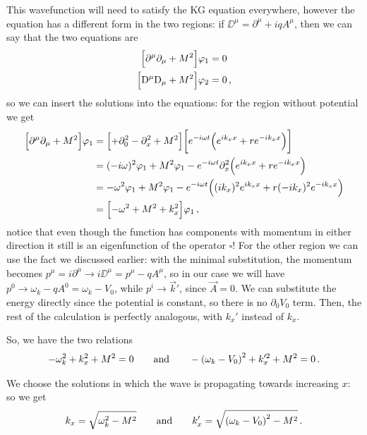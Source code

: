 \documentclass[main.tex]{subfiles}
\begin{document}
This wavefunction will need to satisfy the KG equation everywhere, however the equation has a different form in the two regions: if \(\DD^{\mu } = \partial^{\mu } + iqA^{\mu }\), then we can say that the two equations are 
%
\begin{align}
  \qty[\partial^{\mu } \partial_{\mu } + M^2] \varphi_1 &= 0 \\
  \qty[\mathrm{D}^{\mu } \mathrm{D}_{\mu } + M^2] \varphi_2 &= 0 
\,,
\end{align}
%
so we can insert the solutions into the equations: for the region without potential we get
%
\begin{align}
\qty[\partial^{\mu } \partial_{\mu } + M^2] \varphi_1 &= \qty[+ \partial_0^2 - \partial_{x}^2 + M^2 ] \qty[e^{-i \omega t} \qty(e^{ik_{x}x} + r e^{-ik_x x})]   \\
&= (-i\omega)^2 \varphi_1 + M^2 \varphi_1 - e^{-i \omega t}\partial_{x}^2  \qty(e^{ik_{x}x} + r e^{-ik_x x}) \\
&= -\omega^2 \varphi_1 + M^2 \varphi_1 - e^{-i \omega t}  \qty((ik_x)^2 e^{ik_{x}x} + r (-ik_x)^2 e^{-ik_x x}) \\
&= \qty[-\omega^2 + M^2 + k_x^2 ] \varphi_1  
\,,
\end{align}
%
notice that even though the function has components with momentum in either direction it still is an eigenfunction of the operator \(\square\)! 
For the other region we can use the fact we discussed earlier: with the minimal substitution, the momentum becomes \(p^{\mu } = i \partial^{\mu } \rightarrow i \DD^{\mu } = p^{\mu } - qA^{\mu }\), so in our case we will have \(p^{0} \rightarrow \omega_{k} - q A^{0} = \omega_{k} - V_0 \), while \(p^{i} \rightarrow \vec{k}'\), since \(\vec{A} = 0\). We can substitute the energy directly since the potential is constant, so there is no \(\partial_0 V_0 \) term. 
Then, the rest of the calculation is perfectly analogous, with \(k_{x}'\) instead of \(k_x\).

So, we have the two relations 
%
\begin{align} \label{eq:dispersion-relation-general}
- \omega_k^2 + k_x^2 + M^2 = 0
\qquad \text{and} \qquad
- \qty(\omega_{k} - V_0 )^2 + k_x^{\prime 2}  + M^2 = 0
\,.
\end{align}

We choose the solutions in which the wave is propagating towards increasing \(x\): so we get 
%
\begin{align}
k_x = \sqrt{\omega_{k}^2  - M^2} 
\qquad \text{and} \qquad
k_x^{\prime} = \sqrt{\qty(\omega_{k} - V_0)^2 - M^2}
\,.
\end{align}
\end{document}
